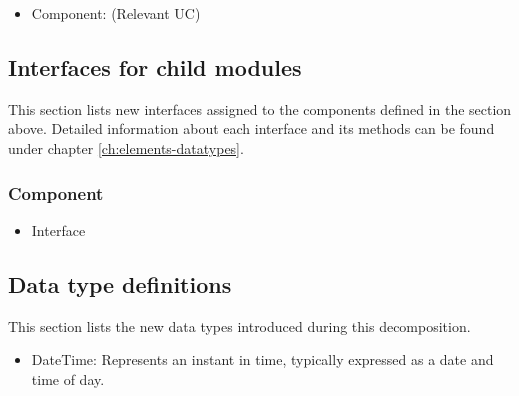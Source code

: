     \begin{itemize}
        \item Component: (Relevant UC)
    \end{itemize}


\subsection{Interfaces for child modules}
    This section lists new interfaces assigned to the components defined
    in the section above. Detailed information about each interface and
    its methods can be found under chapter \ref{ch:elements-datatypes}. \\

    \subsubsection{Component}
        \begin{itemize}
            \item Interface
        \end{itemize}

\subsection{Data type definitions}
    This section lists the new data types introduced during this decomposition.

    \begin{itemize}
        \item DateTime: Represents an instant in time, typically expressed as a date and time of day.
    \end{itemize}

